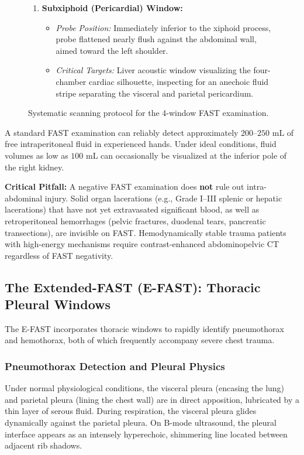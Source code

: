 \documentclass[11pt,a4paper]{article}
\begin{document}
\begin{figure}[htbp]
\begin{tcolorbox}[colback=purple!5!white,colframe=purple!60!black,title=\textbf{The Four Standard FAST Acoustic Windows},width=\linewidth]
\begin{enumerate}[leftmargin=1.5em]
    \item \textbf{Subxiphoid (Pericardial) Window:}
    \begin{itemize}
        \item \textit{Probe Position:} Immediately inferior to the xiphoid process, probe flattened nearly flush against the abdominal wall, aimed toward the left shoulder.
        \item \textit{Critical Targets:} Liver acoustic window visualizing the four-chamber cardiac silhouette, inspecting for an anechoic fluid stripe separating the visceral and parietal pericardium.
    \end{itemize}
\end{enumerate}
\end{tcolorbox}
\caption{Systematic scanning protocol for the 4-window FAST examination.}
\label{fig:fast_windows}
\end{figure}

\begin{clinicalpearl}
A standard FAST examination can reliably detect approximately $200\text{--}250\text{ mL}$ of free intraperitoneal fluid in experienced hands. Under ideal conditions, fluid volumes as low as $100\text{ mL}$ can occasionally be visualized at the inferior pole of the right kidney. 

\textbf{Critical Pitfall:} A negative FAST examination does \textbf{not} rule out intra-abdominal injury. Solid organ lacerations (e.g., Grade I--III splenic or hepatic lacerations) that have not yet extravasated significant blood, as well as retroperitoneal hemorrhages (pelvic fractures, duodenal tears, pancreatic transections), are invisible on FAST. Hemodynamically stable trauma patients with high-energy mechanisms require contrast-enhanced abdominopelvic CT regardless of FAST negativity.
\end{clinicalpearl}

\subsection{The Extended-FAST (E-FAST): Thoracic Pleural Windows}
The E-FAST incorporates thoracic windows to rapidly identify pneumothorax and hemothorax, both of which frequently accompany severe chest trauma.

\subsubsection{Pneumothorax Detection and Pleural Physics}
Under normal physiological conditions, the visceral pleura (encasing the lung) and parietal pleura (lining the chest wall) are in direct apposition, lubricated by a thin layer of serous fluid. During respiration, the visceral pleura glides dynamically against the parietal pleura. On B-mode ultrasound, the pleural interface appears as an intensely hyperechoic, shimmering line located between adjacent rib shadows.
\end{document}
